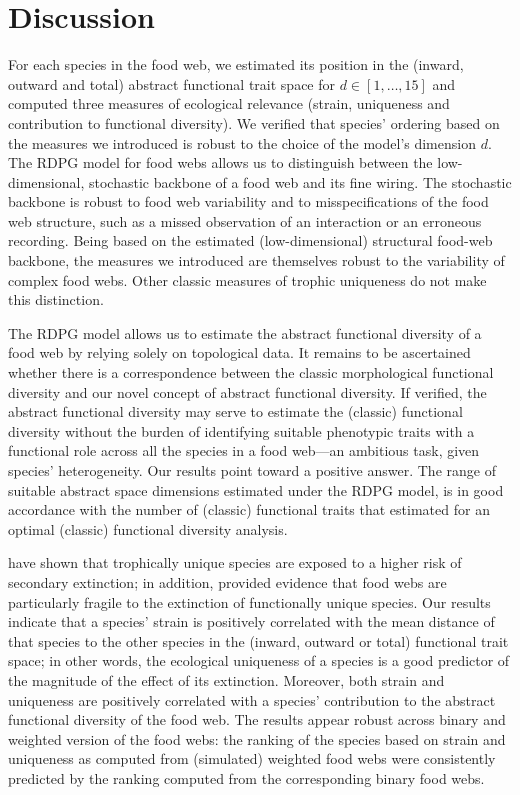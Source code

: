 \documentclass[]{rsos}%
\begin{document}
 \section{Discussion}

For each species in the food web, we estimated its position in the (inward, outward and
total) abstract functional trait space for $d \in \left[ 1, \dots, 15\right]$
and computed three measures of ecological relevance (strain, uniqueness and
contribution to functional diversity). We verified that species' ordering
based on the measures we introduced is robust to the choice of the model's dimension
$d$. The RDPG model for food webs allows us to distinguish between the low-dimensional,
stochastic backbone of a food web and its fine wiring. The
stochastic backbone is robust to food web variability and to misspecifications
of the food web structure, such as a missed observation of an interaction or
an erroneous recording.  Being based on the estimated (low-dimensional)
structural food-web backbone, the measures we introduced are themselves robust
to the variability of complex food webs. Other classic measures of trophic
uniqueness \citep{yodzis1999search,luczkovich2003defining,jordan2009trophic} do
not make this distinction.

The RDPG model allows us to estimate the abstract functional
diversity of a food web by relying solely on topological data. 
It remains to be ascertained whether there is a correspondence between the classic
morphological functional diversity and our novel concept of abstract
functional diversity. If verified, the abstract functional diversity may serve
to estimate the (classic) functional diversity without the burden of
identifying suitable phenotypic traits with a functional role across all the
species in a food web---an ambitious task, given species' heterogeneity. 
Our results point toward a positive answer. The
range of suitable abstract space dimensions estimated under the RDPG model,
is in good accordance with the number of (classic) functional traits that \citet{maire2015many}
estimated for an optimal (classic) functional diversity analysis.

\citet{petchey2008trophically} have shown that trophically unique species
are exposed to a higher risk of secondary extinction; in addition, \citet{o2010loss} provided evidence that
food webs are particularly fragile to the extinction of functionally unique species.
Our results indicate that a species' strain  is positively correlated with  the mean distance of that
species to the other species in the (inward, outward or total) functional trait space;
in other words, the ecological uniqueness of a species is  a good predictor of the magnitude of the effect
of its extinction. Moreover, both strain and uniqueness are positively correlated
with a species' contribution to the abstract functional diversity of the food
web. The results appear robust across binary and weighted version of the food webs:
the ranking of the species based on strain and uniqueness as computed from (simulated) weighted food webs
were consistently predicted by the ranking computed from the corresponding binary food webs.
\end{document}
